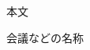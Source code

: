 \documentclass[commentary]{jsaiopt}        %
\author{\commentator{著者名}{日本語所属名}}
\begin{document}
\maketitle

本文

\begin{Calendar}{会議などの名称}%
\end{Calendar}
\end{document}
